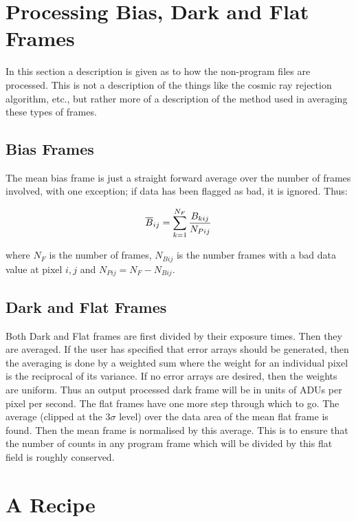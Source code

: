 \section{Processing Bias, Dark and Flat Frames} \label{sec:proc_flat}

In this section a description is given as to how the non-program files are
processed.  This is not a description of the things like the cosmic ray
rejection algorithm, etc., but rather more of a description of the method  used
in averaging these types of frames.

\subsection{Bias Frames}

The mean bias frame is just a straight forward average over the number of
frames involved, with one exception; if data has been flagged as bad, it is
ignored. Thus:

\begin{displaymath}
\overline{B}_{ij} = \sum_{k=1}^{N_F} {B_{kij} \over N_{Pij}}
\end{displaymath}

where $N_F$ is the number of frames, $N_{Bij}$ is the number frames with a bad
data value at pixel $i,j$ and $N_{Pij} = N_F - N_{Bij}$.

\subsection{Dark and Flat Frames}

Both Dark and Flat frames are first divided by their exposure times.  Then they
are averaged.  If the user has specified that error arrays should be generated,
then the averaging is done by a weighted sum where the weight for an individual
pixel is the reciprocal of its variance.  If no error arrays are desired, then
the weights are uniform.  Thus an output processed dark frame will be in units
of ADUs per pixel per second.  The flat frames have one more step through which
to go.  The average (clipped at the $3\sigma$ level) over the data area of the
mean flat frame is found.  Then the mean frame is normalised by this average. 
This is to ensure that the number of counts in any program frame which will be
divided by this flat field is roughly conserved.

\section{A Recipe}

